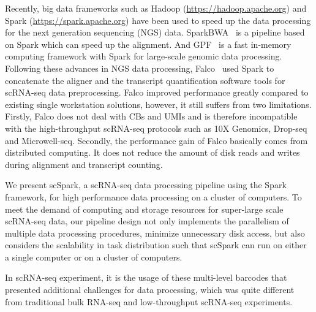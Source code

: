 \documentclass[conference]{IEEEtran}
\begin{document}
Recently, big data frameworks such as Hadoop (\url{https://hadoop.apache.org}) and Spark (\url{https://spark.apache.org}) have been used to speed up the data processing for the next generation sequencing (NGS) data. 
SparkBWA~\cite{Abun2016SparkBWA} is a pipeline based on Spark which can speed up the alignment.
And GPF~\cite{Li2018Highperformance} is a fast in-memory computing framework with Spark for large-scale genomic data processing.
Following these advances in NGS data processing, Falco~\cite{Yang2017Falco} used Spark to concatenate the aligner and the transcript quantification software tools for scRNA-seq data preprocessing. Falco improved performance greatly compared to existing single workstation solutions, however, it still suffers from two limitations. 
Firstly, Falco does not deal with CBs and UMIs and is therefore incompatible with the high-throughput scRNA-seq protocols such as 10X Genomics, Drop-seq and Microwell-seq.
Secondly, the performance gain of Falco basically comes from distributed computing.
It does not reduce the amount of disk reads and writes during alignment and transcript counting. 

We present scSpark, a scRNA-seq data processing pipeline using the Spark framework, for high performance data processing on a cluster of computers. 
To meet the demand of computing and storage resources for super-large scale scRNA-seq data, 
our pipeline design not only implements the parallelism of multiple data processing procedures, minimize unnecessary disk access, but also considers the scalability in task distribution such that scSpark can run on either a single computer or on a cluster of computers. 



\iffalse

In scRNA-seq experiment, it is the usage of these multi-level barcodes that presented additional challenges for data processing, which was quite different from traditional bulk RNA-seq and low-throughput scRNA-seq experiments. 
\end{document}
